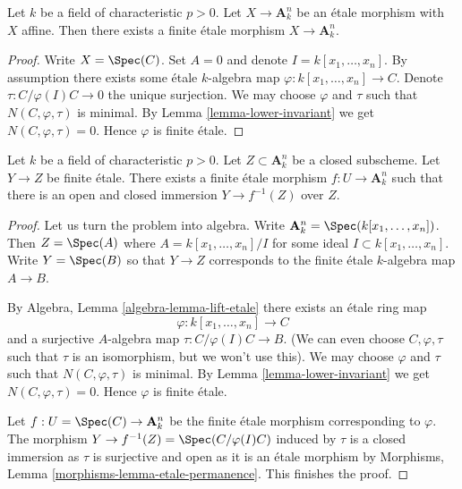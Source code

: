 \begin{lemma}
\label{lemma-affine-etale-over-affine-space}
Let $k$ be a field of characteristic $p > 0$. Let $X \to \mathbf{A}^n_k$ be an
\'etale morphism with $X$ affine. Then there exists a finite \'etale
morphism $X \to \mathbf{A}^n_k$.
\end{lemma}

\begin{proof}
Write $X = \Spec(C)$. Set $A = 0$ and denote $I = k[x_1, \ldots, x_n]$.
By assumption there exists some \'etale $k$-algebra map
$\varphi : k[x_1, \ldots, x_n] \to C$. Denote $\tau : C/\varphi(I)C \to 0$
the unique surjection. We may choose $\varphi$ and $\tau$ such
that $N(C, \varphi, \tau)$ is minimal. By Lemma \ref{lemma-lower-invariant}
we get $N(C, \varphi, \tau) = 0$. Hence $\varphi$ is finite \'etale.
\end{proof}

\begin{lemma}
\label{lemma-dominate-affine-space}
Let $k$ be a field of characteristic $p > 0$. Let $Z \subset \mathbf{A}^n_k$
be a closed subscheme. Let $Y \to Z$ be finite \'etale. There exists a
finite \'etale morphism $f : U \to \mathbf{A}^n_k$ such that
there is an open and closed immersion $Y \to f^{-1}(Z)$ over $Z$.
\end{lemma}

\begin{proof}
Let us turn the problem into algebra. Write
$\mathbf{A}^n_k = \Spec(k[x_1, \ldots, x_n])$.
Then $Z = \Spec(A)$ where $A = k[x_1, \ldots, x_n]/I$
for some ideal $I \subset k[x_1, \ldots, x_n]$.
Write $Y = \Spec(B)$ so that $Y \to Z$ corresponds to
the finite \'etale $k$-algebra map $A \to B$.

\medskip\noindent
By Algebra, Lemma \ref{algebra-lemma-lift-etale}
there exists an \'etale ring map
$$
\varphi : k[x_1, \ldots, x_n] \to C
$$
and a surjective $A$-algebra map $\tau : C/\varphi(I)C \to B$.
(We can even choose $C, \varphi, \tau$ such that $\tau$ is an isomorphism,
but we won't use this). We may choose $\varphi$ and $\tau$ such
that $N(C, \varphi, \tau)$ is minimal. By Lemma \ref{lemma-lower-invariant}
we get $N(C, \varphi, \tau) = 0$. Hence $\varphi$ is finite \'etale.

\medskip\noindent
Let $f : U = \Spec(C) \to \mathbf{A}^n_k$ be the finite \'etale
morphism corresponding to $\varphi$. The morphism
$Y \to f^{-1}(Z) = \Spec(C/\varphi(I)C)$ induced by $\tau$
is a closed immersion as $\tau$ is surjective and open as
it is an \'etale morphism by Morphisms, Lemma
\ref{morphisms-lemma-etale-permanence}. This finishes the proof.
\end{proof}

